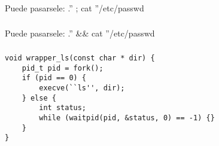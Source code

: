 \subsubsection{}
Puede pasarsele: .'' ; cat ''/etc/passwd

\subsubsection{}
Puede pasarsele: .'' \&\& cat ''/etc/passwd

\subsubsection{}
\begin{codesnippet}
\begin{verbatim}
void wrapper_ls(const char * dir) {
    pid_t pid = fork();
    if (pid == 0) {
        execve(``ls'', dir);
    } else {
        int status;
        while (waitpid(pid, &status, 0) == -1) {}
    }
}
\end{verbatim}
\end{codesnippet}
